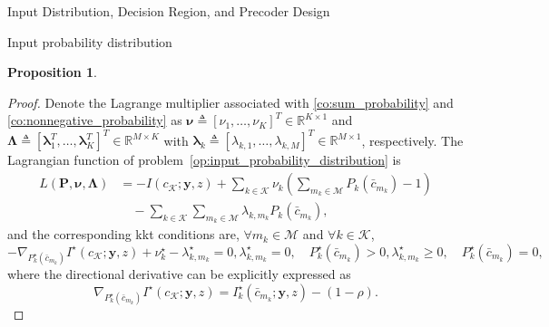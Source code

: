 \documentclass[journal]{IEEEtran}
\newtheorem{proposition}{Proposition}
\begin{document}
\begin{section}{Input Distribution, Decision Region, and Precoder Design}
\begin{subsection}{Input probability distribution}
\begin{proposition}
				\label{pr:optimal_conditions}
			\end{proposition}
			\begin{proof}
				Denote the Lagrange multiplier associated with \eqref{co:sum_probability} and \eqref{co:nonnegative_probability} as $\boldsymbol{\nu} \triangleq [\nu_1,\ldots,\nu_K]^T \in \mathbb{R}^{K \times 1}$ and $\boldsymbol{\Lambda} \triangleq [\boldsymbol{\lambda}_1^T,\ldots,\boldsymbol{\lambda}_K^T]^T \in \mathbb{R}^{M \times K}$ with $\boldsymbol{\lambda}_k \triangleq [\lambda_{k,1},\ldots,\lambda_{k,M}]^T \in \mathbb{R}^{M \times 1}$, respectively. The Lagrangian function of problem~\eqref{op:input_probability_distribution} is
				\begin{align}
					L(\boldsymbol{P},\boldsymbol{\nu},\boldsymbol{\Lambda})
					& = - I(c_{\mathcal{K}};\boldsymbol{y},z) + \sum_{k \in \mathcal{K}} \nu_k \left( \sum_{m_k \in \mathcal{M}} P_k(\bar{c}_{m_k}) - 1 \right)\nonumber\\
					& \quad - \sum_{k \in \mathcal{K}} \sum_{m_k \in \mathcal{M}} \lambda_{k,m_k} P_k(\bar{c}_{m_k}),
				\end{align}
				and the corresponding \gls{kkt} conditions are, $\forall m_k \in \mathcal{M}$ and $\forall k \in \mathcal{K}$,
				\begin{subequations}
					\begin{equation}
						- \nabla_{P_k^\star(\bar{c}_{m_k})} I^\star(c_{\mathcal{K}};\boldsymbol{y},z) + \nu_k^\star - \lambda_{k,m_k}^\star = 0,
					\end{equation}
					\begin{equation}
						\lambda_{k,m_k}^\star = 0, \quad P_k^\star(\bar{c}_{m_k}) > 0,
					\end{equation}
					\begin{equation}
						\lambda_{k,m_k}^\star \ge 0, \quad P_k^\star(\bar{c}_{m_k}) = 0,
					\end{equation}
				\end{subequations}
				where the directional derivative can be explicitly expressed as
				\begin{equation}
					\nabla_{P_k^\star(\bar{c}_{m_k})} I^\star(c_{\mathcal{K}};\boldsymbol{y},z) = I_k^\star(\bar{c}_{m_k};\boldsymbol{y},z) - (1 - \rho).
				\end{equation}


\end{proof}
\end{subsection}
\end{section}
\end{document}
